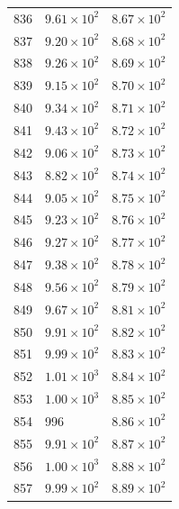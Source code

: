 \begin{table}[H]
\begin{tabular}{lll}
836 & $\displaystyle 9.61 \times 10^{2}$ & $\displaystyle 8.67 \times 10^{2}$ \\
837 & $\displaystyle 9.20 \times 10^{2}$ & $\displaystyle 8.68 \times 10^{2}$ \\
838 & $\displaystyle 9.26 \times 10^{2}$ & $\displaystyle 8.69 \times 10^{2}$ \\
839 & $\displaystyle 9.15 \times 10^{2}$ & $\displaystyle 8.70 \times 10^{2}$ \\
840 & $\displaystyle 9.34 \times 10^{2}$ & $\displaystyle 8.71 \times 10^{2}$ \\
841 & $\displaystyle 9.43 \times 10^{2}$ & $\displaystyle 8.72 \times 10^{2}$ \\
842 & $\displaystyle 9.06 \times 10^{2}$ & $\displaystyle 8.73 \times 10^{2}$ \\
843 & $\displaystyle 8.82 \times 10^{2}$ & $\displaystyle 8.74 \times 10^{2}$ \\
844 & $\displaystyle 9.05 \times 10^{2}$ & $\displaystyle 8.75 \times 10^{2}$ \\
845 & $\displaystyle 9.23 \times 10^{2}$ & $\displaystyle 8.76 \times 10^{2}$ \\
846 & $\displaystyle 9.27 \times 10^{2}$ & $\displaystyle 8.77 \times 10^{2}$ \\
847 & $\displaystyle 9.38 \times 10^{2}$ & $\displaystyle 8.78 \times 10^{2}$ \\
848 & $\displaystyle 9.56 \times 10^{2}$ & $\displaystyle 8.79 \times 10^{2}$ \\
849 & $\displaystyle 9.67 \times 10^{2}$ & $\displaystyle 8.81 \times 10^{2}$ \\
850 & $\displaystyle 9.91 \times 10^{2}$ & $\displaystyle 8.82 \times 10^{2}$ \\
851 & $\displaystyle 9.99 \times 10^{2}$ & $\displaystyle 8.83 \times 10^{2}$ \\
852 & $\displaystyle 1.01 \times 10^{3}$ & $\displaystyle 8.84 \times 10^{2}$ \\
853 & $\displaystyle 1.00 \times 10^{3}$ & $\displaystyle 8.85 \times 10^{2}$ \\
854 & 996 & $\displaystyle 8.86 \times 10^{2}$ \\
855 & $\displaystyle 9.91 \times 10^{2}$ & $\displaystyle 8.87 \times 10^{2}$ \\
856 & $\displaystyle 1.00 \times 10^{3}$ & $\displaystyle 8.88 \times 10^{2}$ \\
857 & $\displaystyle 9.99 \times 10^{2}$ & $\displaystyle 8.89 \times 10^{2}$ \\

\end{tabular}
\end{table}
